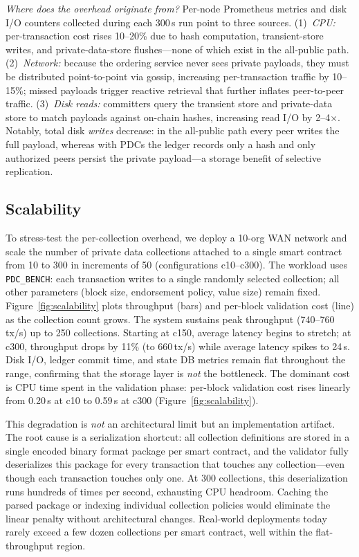 \textit{Where does the overhead originate from?} Per-node Prometheus metrics and disk I/O counters collected during each 300\,s run point to three sources.
(1)~\textit{CPU:} per-transaction cost rises 10--20\% due to hash computation, transient-store writes, and private-data-store flushes---none of which exist in the all-public path.
(2)~\textit{Network:} because the ordering service never sees private payloads, they must be distributed point-to-point via gossip, increasing per-transaction traffic by 10--15\%; missed payloads trigger reactive retrieval that further inflates peer-to-peer traffic.
(3)~\textit{Disk reads:} committers query the transient store and private-data store to match payloads against on-chain hashes, increasing read I/O by 2--4$\times$.
Notably, total disk \textit{writes} decrease: in the all-public path every peer writes the full payload, whereas with PDCs the ledger records only a hash and only authorized peers persist the private payload---a storage benefit of selective replication.
\subsection{Scalability}
To stress-test the per-collection overhead, we deploy a 10-org WAN network and scale the number of private data collections attached to a single smart contract from 10 to 300 in increments of 50 (configurations c10--c300). The workload uses \texttt{PDC\_BENCH}: each transaction writes to a single randomly selected collection; all other parameters (block size, endorsement policy, value size) remain fixed. Figure~\ref{fig:scalability} plots throughput (bars) and per-block validation cost (line) as the collection count grows.
The system sustains peak throughput (740--760\,tx/s) up to 250 collections. Starting at c150, average latency begins to stretch; at c300, throughput drops by 11\% (to 660\,tx/s) while average latency spikes to 24\,s. Disk I/O, ledger commit time, and state DB metrics remain flat throughout the range, confirming that the storage layer is \emph{not} the bottleneck. The dominant cost is CPU time spent in the validation phase: per-block validation cost rises linearly from 0.20\,s at c10 to 0.59\,s at c300 (Figure~\ref{fig:scalability}).

This degradation is \emph{not} an architectural limit but an implementation artifact. The root cause is a serialization shortcut: all collection definitions are stored in a single encoded binary format package per smart contract, and the validator fully deserializes this package for every transaction that touches any collection---even though each transaction touches only one. At 300 collections, this deserialization runs hundreds of times per second, exhausting CPU headroom. Caching the parsed package or indexing individual collection policies would eliminate the linear penalty without architectural changes. Real-world deployments today rarely exceed a few dozen collections per smart contract, well within the flat-throughput region.

